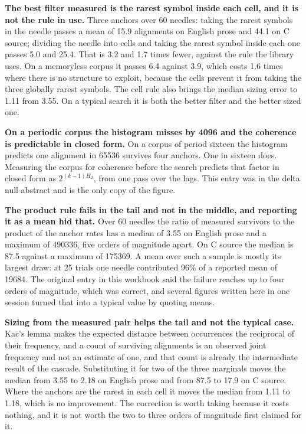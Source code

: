 \textbf{The best filter measured is the rarest symbol inside each cell, and it is not the rule in use.} Three anchors over 60 needles: taking the rarest symbols in the needle passes a mean of 15.9 alignments on English prose and 44.1 on C source; dividing the needle into cells and taking the rarest symbol inside each one passes 5.0 and 25.4. That is 3.2 and 1.7 times fewer, against the rule the library uses. On a memoryless corpus it passes 6.4 against 3.9, which costs 1.6 times where there is no structure to exploit, because the cells prevent it from taking the three globally rarest symbols. The cell rule also brings the median sizing error to 1.11 from 3.55. On a typical search it is both the better filter and the better sized one.

\textbf{On a periodic corpus the histogram misses by 4096 and the coherence is predictable in closed form.} On a corpus of period sixteen the histogram predicts one alignment in 65536 survives four anchors. One in sixteen does. Measuring the corpus for coherence before the search predicts that factor in closed form as \(2^{(k-1)H_2}\), from one pass over the lags. This entry was in the delta null abstract and is the only copy of the figure.

\textbf{The product rule fails in the tail and not in the middle, and reporting it as a mean hid that.} Over 60 needles the ratio of measured survivors to the product of the anchor rates has a median of 3.55 on English prose and a maximum of 490336, five orders of magnitude apart. On C source the median is 87.5 against a maximum of 175369. A mean over such a sample is mostly its largest draw: at 25 trials one needle contributed 96\% of a reported mean of 19684. The original entry in this workbook said the failure reaches up to four orders of magnitude, which was correct, and several figures written here in one session turned that into a typical value by quoting means.

\textbf{Sizing from the measured pair helps the tail and not the typical case.} Kac's lemma makes the expected distance between occurrences the reciprocal of their frequency, and a count of surviving alignments is an observed joint frequency and not an estimate of one, and that count is already the intermediate result of the cascade. Substituting it for two of the three marginals moves the median from 3.55 to 2.18 on English prose and from 87.5 to 17.9 on C source. Where the anchors are the rarest in each cell it moves the median from 1.11 to 1.18, which is no improvement. The correction is worth taking because it costs nothing, and it is not worth the two to three orders of magnitude first claimed for it.

